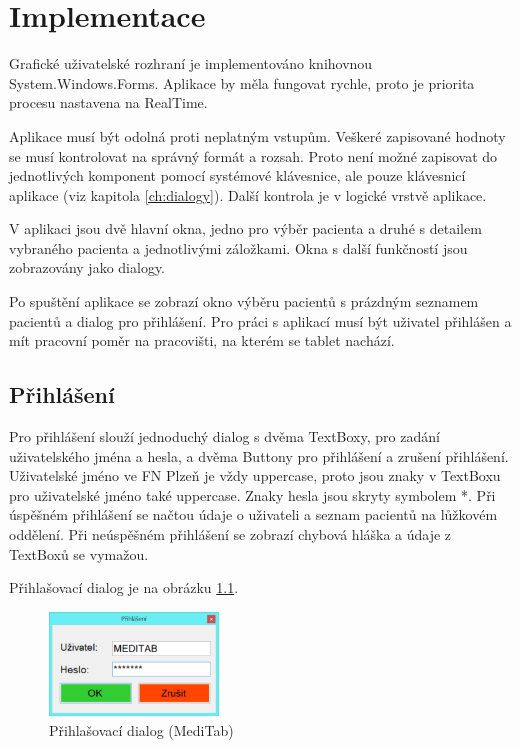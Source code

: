 \chapter{Implementace}

Grafické uživatelské rozhraní je implementováno knihovnou System.Windows.Forms. Aplikace by měla fungovat rychle, proto je priorita procesu nastavena na RealTime.

Aplikace musí být odolná proti neplatným vstupům. Veškeré zapisované hodnoty se musí kontrolovat na správný formát a rozsah. Proto není možné zapisovat do jednotlivých komponent pomocí systémové klávesnice, ale pouze klávesnicí aplikace (viz kapitola \ref{ch:dialogy}). Další kontrola je v logické vrstvě aplikace.

V aplikaci jsou dvě hlavní okna, jedno pro výběr pacienta a druhé s detailem vybraného pacienta a jednotlivými záložkami. Okna s další funkčností jsou zobrazovány jako dialogy.

Po spuštění aplikace se zobrazí okno výběru pacientů s prázdným seznamem pacientů a dialog pro přihlášení. Pro práci s aplikací musí být uživatel přihlášen a mít pracovní poměr na pracovišti, na kterém se tablet nachází.


\section{Přihlášení}

Pro přihlášení slouží jednoduchý dialog s dvěma TextBoxy, pro zadání uživatelského jména a hesla, a dvěma Buttony pro přihlášení a zrušení přihlášení. Uživatelské jméno ve FN Plzeň je vždy uppercase, proto jsou znaky v TextBoxu pro uživatelské jméno také uppercase. Znaky hesla jsou skryty symbolem *. Při úspěšném přihlášení se načtou údaje o uživateli a seznam pacientů na lůžkovém oddělení. Při neúspěšném přihlášení se zobrazí chybová hláška a údaje z TextBoxů se vymažou.

Přihlašovací dialog je na obrázku \ref{fig:login}.

\begin{figure}[H]
	\centering
	\includegraphics[width=0.4\textwidth]{img/meditab/login.eps}
	\caption{Přihlašovací dialog (MediTab)}
  \label{fig:login}
\end{figure}


